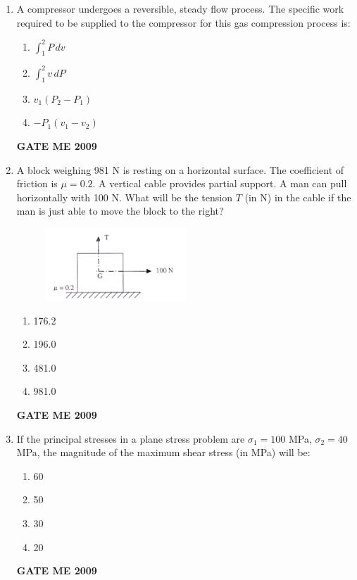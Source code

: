 \documentclass[journal]{IEEEtran}
\begin{document}
\begin{enumerate}[leftmargin=0pt]
\item A compressor undergoes a reversible, steady flow process. The specific work required to be supplied to the compressor for this gas compression process is:
  \begin{enumerate}[label=(\alph*)]
    \item $\displaystyle \int_{1}^{2} P \, dv$
    \item $\displaystyle \int_{1}^{2} v \, dP$
    \item $v_1 (P_2-P_1)$
    \item $-P_1(v_1 - v_2)$
  \end{enumerate}
  \hfill{\textbf{GATE ME 2009}}


\item A block weighing 981 N is resting on a horizontal surface. The coefficient of friction is $\mu=0.2$. A vertical cable provides partial support. A man can pull horizontally with 100 N. What will be the tension $T$ (in N) in the cable if the man is just able to move the block to the right?

    \begin{figure}[h]
      \centering
      \includegraphics[width=0.5\textwidth]{Figs/image (2).png}
    \end{figure}



  \begin{enumerate}[label=(\alph*)]
    \item 176.2
    \item 196.0
    \item 481.0
    \item 981.0
  \end{enumerate}
  \hfill{\textbf{GATE ME 2009}}

\item If the principal stresses in a plane stress problem are $\sigma_1 = 100$ MPa, $\sigma_2 = 40$ MPa, the magnitude of the maximum shear stress (in MPa) will be:
  \begin{enumerate}[label=(\alph*)]
    \item 60
    \item 50
    \item 30
    \item 20
  \end{enumerate}
  \hfill{\textbf{GATE ME 2009}}


\end{enumerate}
\end{document}
